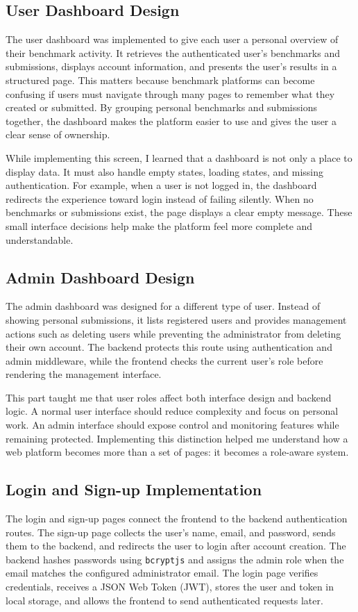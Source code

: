 \documentclass[12pt,a4paper,oneside]{report}
\begin{document}
\subsection{User Dashboard Design}
\noindent The user dashboard was implemented to give each user a personal overview of their benchmark activity. It retrieves the authenticated user's benchmarks and submissions, displays account information, and presents the user's results in a structured page. This matters because benchmark platforms can become confusing if users must navigate through many pages to remember what they created or submitted. By grouping personal benchmarks and submissions together, the dashboard makes the platform easier to use and gives the user a clear sense of ownership.

While implementing this screen, I learned that a dashboard is not only a place to display data. It must also handle empty states, loading states, and missing authentication. For example, when a user is not logged in, the dashboard redirects the experience toward login instead of failing silently. When no benchmarks or submissions exist, the page displays a clear empty message. These small interface decisions help make the platform feel more complete and understandable.

\subsection{Admin Dashboard Design}
\noindent The admin dashboard was designed for a different type of user. Instead of showing personal submissions, it lists registered users and provides management actions such as deleting users while preventing the administrator from deleting their own account. The backend protects this route using authentication and admin middleware, while the frontend checks the current user's role before rendering the management interface.

This part taught me that user roles affect both interface design and backend logic. A normal user interface should reduce complexity and focus on personal work. An admin interface should expose control and monitoring features while remaining protected. Implementing this distinction helped me understand how a web platform becomes more than a set of pages: it becomes a role-aware system.

\subsection{Login and Sign-up Implementation}
\noindent The login and sign-up pages connect the frontend to the backend authentication routes. The sign-up page collects the user's name, email, and password, sends them to the backend, and redirects the user to login after account creation. The backend hashes passwords using \texttt{bcryptjs} and assigns the admin role when the email matches the configured administrator email. The login page verifies credentials, receives a JSON Web Token (JWT), stores the user and token in local storage, and allows the frontend to send authenticated requests later.
\end{document}
